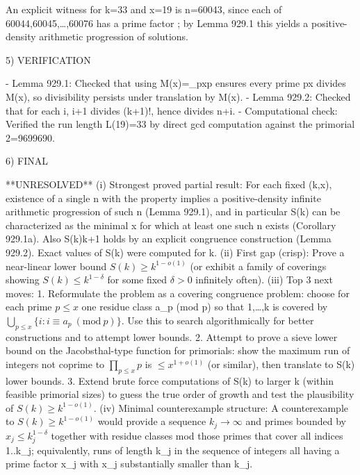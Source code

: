 An explicit witness for k=33 and x=19 is n=60043, since each of 60044,60045,\dots,60076 has a prime factor ; by Lemma 929.1 this yields a positive-density arithmetic progression of solutions.


5) VERIFICATION

- Lemma 929.1: Checked that using M(x)=\prod_{p\le x}p ensures every prime p\le x divides M(x), so divisibility persists under translation by M(x).
- Lemma 929.2: Checked that for each i, i+1 divides (k+1)!, hence divides n+i.
- Computational check: Verified the run length L(19)=33 by direct gcd computation against the primorial 2=9699690.


6) FINAL

**UNRESOLVED**
(i) Strongest proved partial result: For each fixed (k,x), existence of a single n with the property implies a positive-density infinite arithmetic progression of such n (Lemma 929.1), and in particular S(k) can be characterized as the minimal x for which at least one such n exists (Corollary 929.1a). Also S(k)\le k+1 holds by an explicit congruence construction (Lemma 929.2). Exact values of S(k) were computed for k.
(ii) First gap (crisp): Prove a near-linear lower bound \(S(k)\ge k^{1-o(1)}\) (or exhibit a family of coverings showing \(S(k)\le k^{1-\delta}\) for some fixed \(\delta>0\) infinitely often).
(iii) Top 3 next moves:
  1. Reformulate the problem as a covering congruence problem: choose for each prime \(p\le x\) one residue class a_p (mod p) so that {1,\dots,k} is covered by \(\bigcup_{p\le x}\{i: i\equiv a_p\ (\mathrm{mod}\ p)\}\). Use this to search algorithmically for better constructions and to attempt lower bounds.
  2. Attempt to prove a sieve lower bound on the Jacobsthal-type function for primorials: show the maximum run of integers not coprime to \(\prod_{p\le x} p\) is \(\le x^{1+o(1)}\) (or similar), then translate to S(k) lower bounds.
  3. Extend brute force computations of S(k) to larger k (within feasible primorial sizes) to guess the true order of growth and test the plausibility of \(S(k)\ge k^{1-o(1)}\).
(iv) Minimal counterexample structure: A counterexample to \(S(k)\ge k^{1-o(1)}\) would provide a sequence \(k_j\to\infty\) and primes bounded by \(x_j\le k_j^{1-\delta}\) together with residue classes mod those primes that cover all indices 1..k_j; equivalently, runs of length k_j in the sequence of integers all having a prime factor \le x_j with x_j substantially smaller than k_j.
